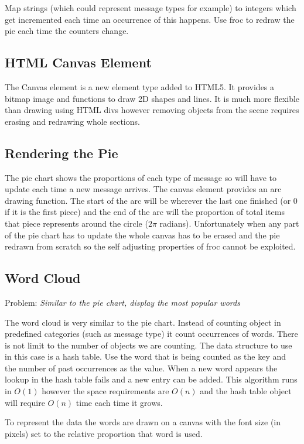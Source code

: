 Map strings (which could represent message types for example) to integers which get incremented each time an occurrence of this happens. Use froc to redraw the pie each time the counters change.

\subsection{HTML Canvas Element}
The Canvas element is a new element type added to HTML5. It provides a bitmap image and functions to draw 2D shapes and lines. It is much more flexible than drawing using HTML divs however removing objects from the scene requires erasing and redrawing whole sections.

\subsection{Rendering the Pie}
The pie chart shows the proportions of each type of message so will have to update each time a new message arrives. The canvas element provides an arc drawing function. The start of the arc will be wherever the last one finished (or 0 if it is the first piece) and the end of the arc will the proportion of total items that piece represents around the circle ($2\pi$ radians). Unfortunately when any part of the pie chart has to update the whole canvas has to be erased and the pie redrawn from scratch so the self adjusting properties of froc cannot be exploited.

\subsection{Word Cloud}
Problem: \emph{Similar to the pie chart, display the most popular words}

The word cloud is very similar to the pie chart. Instead of counting object in predefined categories (such as message type) it count occurrences of words. There is not limit to the number of objects we are counting. The data structure to use in this case is a hash table. Use the word that is being counted as the key and the number of past occurrences as the value. When a new word appears the lookup in the hash table fails and a new entry can be added. This algorithm runs in \texttt{$O(1)$} however the space requirements are \texttt{$O(n)$} and the hash table object will require \texttt{$O(n)$} time each time it grows.

To represent the data the words are drawn on a canvas with the font size (in pixels) set to the relative proportion that word is used.

